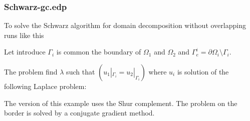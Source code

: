 \documentclass[a4paper,twoside,12pt]{book}
\def\p{\partial}
\begin{document}
\subsubsection{Schwarz-gc.edp}
To solve
the Schwarz algorithm for domain decomposition without overlapping  runs like this

Let introduce  $\Gamma_i$ is  common the boundary of $\Omega_1$ and
$\Omega_2$ and    $\Gamma_e^i= \p \Omega_i \setminus  \Gamma_i$.

The problem  find  $\lambda$ such that $ (u_1|_{\Gamma_i}=u_2|_{\Gamma_i}) $
where  $u_i$ is solution of the following Laplace problem:

The version of this example uses the  Shur complement. The  problem on the border 
is solved by a conjugate gradient method.
\end{document}
